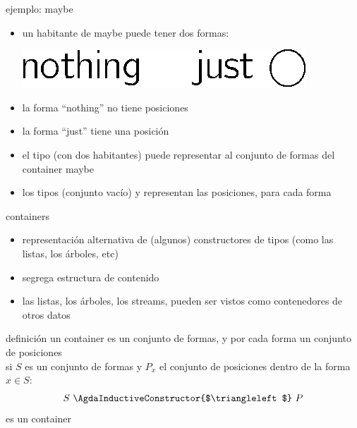 \documentclass[9pt]{beamer}
\newcommand{\saltar}{\vspace{1ex}}
\begin{document}
\begin{frame}{ejemplo: maybe}
  \begin{itemize}
  \item un habitante de maybe puede tener dos formas: \saltar
    \begin{center}\hspace{-2cm}\includegraphics[scale=0.5]{img/emaybe.eps}\end{center}
    \pause
  \item la forma ``nothing'' no tiene posiciones
  \item la forma ``just'' tiene una posición
    \pause
  \end{itemize}
  \begin{itemize} [triangle]
  \item el tipo  (con dos habitantes) puede representar al conjunto de formas del container maybe
  \item los tipos \AgdaDatatype{$\emptyset$} (conjunto vacío) y  representan las posiciones, para cada forma
  \end{itemize}
\end{frame}


\begin{frame}{containers}
  \begin{itemize}
  \item representación alternativa de (algunos) constructores de tipos (como las listas, los árboles, etc)
  \item segrega \alert{estructura} de \alert{contenido}
  \item las listas, los árboles, los streams, pueden ser vistos como \alert{contenedores} de otros datos
  \end{itemize}
  \pause
  \begin{block}{definición}
    un \alert{container} es un conjunto de formas, y por cada forma un conjunto de posiciones\\ \saltar
    si $S$ es un conjunto de formas y $P_x$ el conjunto de posiciones dentro de la forma $x \in S$:\\
    $$S \ \AgdaInductiveConstructor{$\triangleleft$}\ P$$
    es un container\saltar
  \end{block}
\end{frame}
\end{document}
